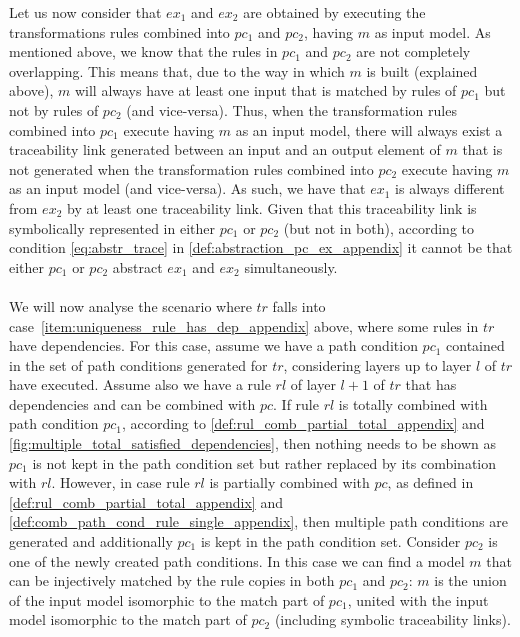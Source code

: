 \begin{ps}
Let us now consider that $ex_1$ and $ex_2$ are obtained by executing the transformations rules combined into $pc_1$ and $pc_2$, having $m$ as input model. As mentioned above, we know that the rules in $pc_1$ and $pc_2$ are not completely overlapping. This means that, due to the way in which $m$ is built (explained above), $m$ will always have at least one input that is matched by rules of $pc_1$ but not by rules of $pc_2$ (and vice-versa). Thus, when the transformation rules combined into $pc_1$ execute having $m$ as an input model, there will always exist a traceability link generated between an input and an output element of $m$ that is not generated when the transformation rules combined into $pc_2$ execute having $m$ as an input model (and vice-versa). As such, we have that $ex_1$ is always different from $ex_2$ by at least one traceability link. Given that this traceability link is symbolically represented in either $pc_1$ or $pc_2$ (but not in both), according to condition \cref{eq:abstr_trace} in \cref{def:abstraction_pc_ex_appendix} it cannot be that either $pc_1$ or $pc_2$ abstract $ex_1$ and $ex_2$ simultaneously.\\\\
We will now analyse the scenario where $tr$ falls into case~\ref{item:uniqueness_rule_has_dep_appendix} above, where some rules in $tr$ have dependencies. For this case, assume we have a path condition $pc_1$ contained in the set of path conditions generated for $tr$, considering layers up to layer $l$ of $tr$ have executed. Assume also we have a rule $rl$ of layer $l+1$ of $tr$ that has dependencies and can be combined with $pc$. If rule $rl$ is totally combined with path condition $pc_1$, according to \cref{def:rul_comb_partial_total_appendix} and \cref{fig:multiple_total_satisfied_dependencies}, then nothing needs to be shown as $pc_1$ is not kept in the path condition set but rather replaced by its combination with $rl$. However, in case rule $rl$ is partially combined with $pc$, as defined in \cref{def:rul_comb_partial_total_appendix} and \cref{def:comb_path_cond_rule_single_appendix}, then multiple path conditions are generated and additionally $pc_1$ is kept in the path condition set. Consider $pc_2$ is one of the newly created path conditions. In this case we can find a model $m$ that can be injectively matched by the rule copies in both $pc_1$ and $pc_2$: $m$ is the union of the input model isomorphic to the match part of $pc_1$, united with the input model isomorphic to the match part of $pc_2$ (including symbolic traceability links).\vspace{.3cm}


\end{ps}
